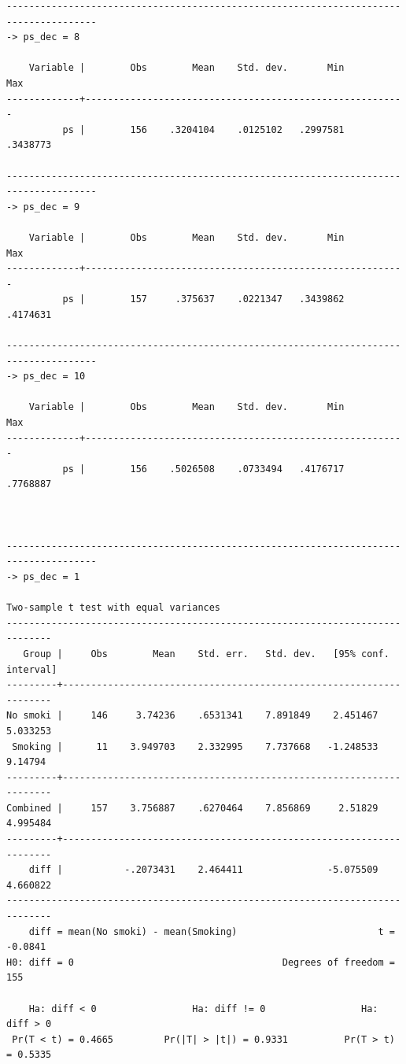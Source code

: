 \documentclass[
  10pt,
  a4paper,
]{book}
\begin{document}
\begin{verbatim}
--------------------------------------------------------------------------------------
-> ps_dec = 8

    Variable |        Obs        Mean    Std. dev.       Min        Max
-------------+---------------------------------------------------------
          ps |        156    .3204104    .0125102   .2997581   .3438773

--------------------------------------------------------------------------------------
-> ps_dec = 9

    Variable |        Obs        Mean    Std. dev.       Min        Max
-------------+---------------------------------------------------------
          ps |        157     .375637    .0221347   .3439862   .4174631

--------------------------------------------------------------------------------------
-> ps_dec = 10

    Variable |        Obs        Mean    Std. dev.       Min        Max
-------------+---------------------------------------------------------
          ps |        156    .5026508    .0733494   .4176717   .7768887



--------------------------------------------------------------------------------------
-> ps_dec = 1

Two-sample t test with equal variances
------------------------------------------------------------------------------
   Group |     Obs        Mean    Std. err.   Std. dev.   [95% conf. interval]
---------+--------------------------------------------------------------------
No smoki |     146     3.74236    .6531341    7.891849    2.451467    5.033253
 Smoking |      11    3.949703    2.332995    7.737668   -1.248533     9.14794
---------+--------------------------------------------------------------------
Combined |     157    3.756887    .6270464    7.856869     2.51829    4.995484
---------+--------------------------------------------------------------------
    diff |           -.2073431    2.464411               -5.075509    4.660822
------------------------------------------------------------------------------
    diff = mean(No smoki) - mean(Smoking)                         t =  -0.0841
H0: diff = 0                                     Degrees of freedom =      155

    Ha: diff < 0                 Ha: diff != 0                 Ha: diff > 0
 Pr(T < t) = 0.4665         Pr(|T| > |t|) = 0.9331          Pr(T > t) = 0.5335


\end{verbatim}
\end{document}
